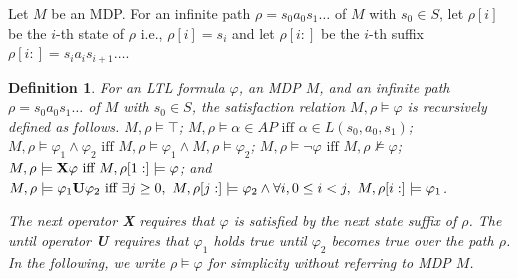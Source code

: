 \documentclass[letterpaper, 10 pt, conference]{ieeeconf}  %
\newtheorem{definition}{Definition}
\begin{document}
Let $ M $ be an MDP.
For an infinite path $\rho = s_0a_0s_1 \ldots $ of $ M $ with $ s_0 \in S $, let $\rho[i]$ be the $i$-th state of $\rho$ i.e., $\rho[i]=s_i$ and let $\rho[i:]$ be the $i$-th suffix $\rho[i:]=s_ia_is_{i+1} \ldots $.
\begin{definition}
	For an LTL formula $\varphi$, an MDP $M$, and an infinite path $\rho = s_0a_0s_1 \ldots$ of $ M $ with $ s_0 \in S $, the satisfaction relation $M,\rho \models \varphi$ is recursively defined as follows. $M, \rho \models \top$; $M, \rho \models \alpha \in AP \text{ iff } \alpha \in L(s_0,a_0,s_1)$; $M, \rho \models \varphi_1 \land \varphi_2 \text{ iff } M, \rho \models \varphi_1 \land M, \rho \models \varphi_2$; $M, \rho \models \neg \varphi \text{ iff } M, \rho \not\models \varphi$; $ M, \rho \models \text{{\bf X}}\varphi \text{ iff } M, \rho[1:] \models \varphi$; and $M, \rho \models \varphi_1 \text{{\bf U}} \varphi_2 \text{ iff } \exists j \geq 0, \ M, \rho[j:] \models \varphi_2 \land \forall i, 0\leq i < j, \ M, \rho[i:] \models \varphi_1$.

The next operator {\bf X} requires that $\varphi$ is satisfied by the next state suffix of $\rho$. The until operator {\bf U} requires that $\varphi_1$ holds true until $\varphi_2$ becomes true over the path $\rho$.
In the following, we write $ \rho \models \varphi $ for simplicity without referring to MDP $ M $.



\end{definition}
\end{document}
